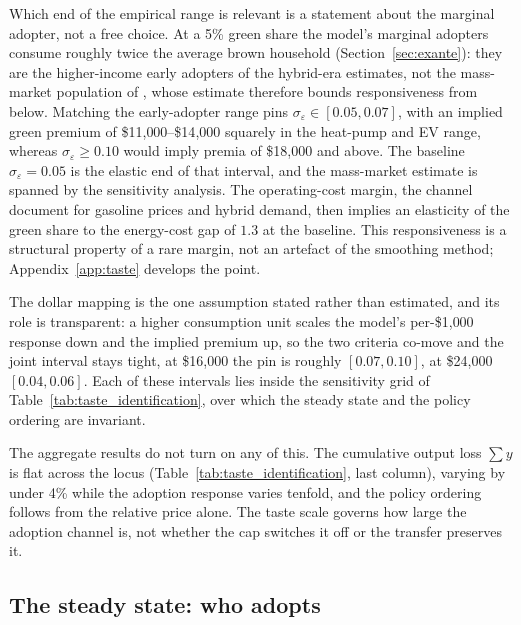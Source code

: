 Which end of the empirical range is relevant is a statement about the marginal
adopter, not a free choice. At a 5\% green share the model's marginal adopters
consume roughly twice the average brown household (Section~\ref{sec:exante}): they
are the higher-income early adopters of the hybrid-era estimates, not the
mass-market population of \citet{MuehleggerRapson2022}, whose estimate therefore bounds
responsiveness from below. Matching the early-adopter range pins
$\sigma_\varepsilon\in[0.05,0.07]$, with an implied green premium of
\$11{,}000--\$14{,}000 squarely in the heat-pump and EV range, whereas
$\sigma_\varepsilon\ge 0.10$ would imply premia of \$18{,}000 and above. The baseline
$\sigma_\varepsilon=0.05$ is the elastic end of that interval, and the mass-market
estimate is spanned by the sensitivity analysis. The operating-cost margin, the
channel \citet{BeresteanuLi2011} document for gasoline prices and hybrid demand, then
implies an elasticity of the green share to the energy-cost gap of $1.3$ at the
baseline. This responsiveness is a structural property of a rare margin, not an
artefact of the smoothing method; Appendix~\ref{app:taste} develops the point.

The dollar mapping is the one assumption stated rather than estimated, and its role
is transparent: a higher consumption unit scales the model's per-\$1{,}000 response
down and the implied premium up, so the two criteria co-move and the joint interval
stays tight, at \$16{,}000 the pin is roughly $[0.07,0.10]$, at \$24{,}000
$[0.04,0.06]$. Each of these intervals lies inside the sensitivity grid of
Table~\ref{tab:taste_identification}, over which the steady state and the policy ordering are
invariant.

The aggregate results do not turn on any of this. The cumulative output loss
$\sum y$ is flat across the locus (Table~\ref{tab:taste_identification}, last column),
varying by under 4\% while the adoption response varies tenfold, and the policy
ordering follows from the relative price alone. The taste scale governs how large the
adoption channel is, not whether the cap switches it off or the transfer preserves
it.

\subsection{The steady state: who adopts}
\label{sec:ss_adoption}

